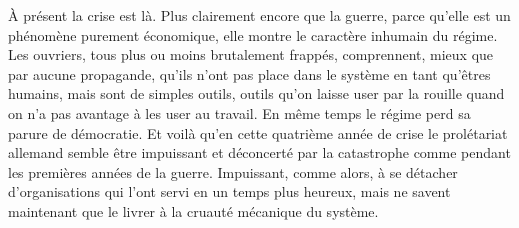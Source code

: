 \documentclass[french,twoside]{book} %
\begin{document}
À présent la crise est là. Plus clairement encore que la guerre, parce qu'elle est un phénomène purement économique, elle montre le caractère inhumain du régime. Les ouvriers, tous plus ou moins brutalement frappés, compren­nent, mieux que par aucune propagande, qu'ils n'ont pas place dans le système en tant qu'êtres humains, mais sont de simples outils, outils qu'on laisse user par la rouille quand on n'a pas avantage à les user au travail. En même temps le régime perd sa parure de démocratie. Et voilà qu'en cette quatrième année de crise le prolétariat allemand semble être impuissant et déconcerté par la catastrophe comme pendant les premières années de la guerre. Impuissant, comme alors, à se détacher d'organisations qui l'ont servi en un temps plus heureux, mais ne savent maintenant que le livrer à la cruauté mécanique du système.\par
\end{document}
